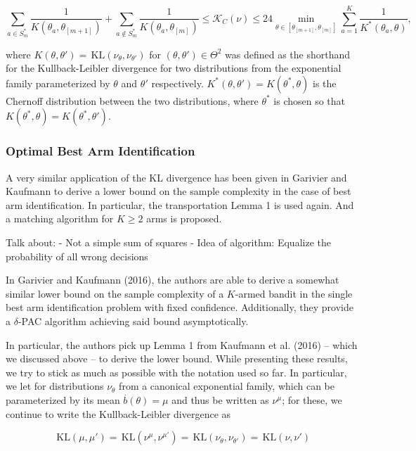 \documentclass[12pt,]{article}
\newcommand{\KL}{\,\text{KL}}
\begin{document}
\begin{equation*}
\sum_{a \in S^*_m} \frac{1}{K(\theta_a, \theta_{[m+1]})} + \sum_{a \notin S^*_m} \frac{1}{K(\theta_a,\theta_{[m]})} \leq \mathcal{K}_C(\nu) \leq 24 \min_{\theta \in [\theta_{[m+1]},\theta_{[m]}]} \sum_{a=1}^{K} \frac{1}{K^*(\theta_a, \theta)},
\end{equation*}

where \(K(\theta, \theta') = \KL(\nu_{\theta}, \nu_{\theta'})\) for
\((\theta, \theta') \in \Theta^2\) was defined as the shorthand for the
Kullback-Leibler divergence for two distributions from the exponential
family parameterized by \(\theta\) and \(\theta'\) respectively.
\(K^*(\theta,\theta') = K(\theta^*, \theta)\) is the Chernoff
distribution between the two distributions, where \(\theta^*\) is chosen
so that \(K(\theta^*,\theta) = K(\theta^*, \theta')\).

\subsubsection{Optimal Best Arm
Identification}\label{optimal-best-arm-identification}

A very similar application of the KL divergence has been given in
Garivier and Kaufmann to derive a lower bound on the sample complexity
in the case of best arm identification. In particular, the
transportation Lemma 1 is used again. And a matching algorithm for
\(K \geq 2\) arms is proposed.

Talk about: - Not a simple sum of squares - Idea of algorithm: Equalize
the probability of all wrong decisions

In Garivier and Kaufmann (2016), the authors are able to derive a
somewhat similar lower bound on the sample complexity of a \(K\)-armed
bandit in the single best arm identification problem with fixed
confidence. Additionally, they provide a \(\delta\)-PAC algorithm
achieving said bound asymptotically.

In particular, the authors pick up Lemma 1 from Kaufmann et al. (2016)
-- which we discussed above -- to derive the lower bound. While
presenting these results, we try to stick as much as possible with the
notation used so far. In particular, we let for distributions
\(\nu_{\theta}\) from a canonical exponential family, which can be
parameterized by its mean \(\stackrel{.}{b}(\theta) = \mu\) and thus be
written as \(\nu^{\mu}\); for these, we continue to write the
Kullback-Leibler divergence as

\begin{equation*}
\KL(\mu, \mu') = \KL(\nu^{\mu},\nu^{\mu'}) = \KL(\nu_{\theta},\nu_{\theta'}) = \KL(\nu, \nu')
\end{equation*}
\end{document}
